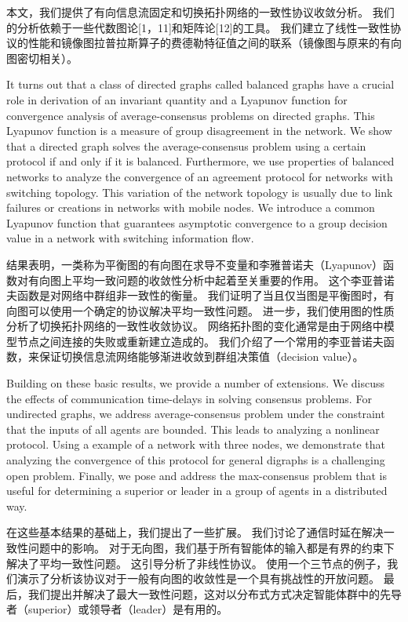 \documentclass{article}
\begin{document}
本文，我们提供了有向信息流固定和切换拓扑网络的一致性协议收敛分析。
我们的分析依赖于一些代数图论[1，11]和矩阵论[12]的工具。
我们建立了线性一致性协议的性能和镜像图拉普拉斯算子的费德勒特征值之间的联系（镜像图与原来的有向图密切相关）。

{\color[gray]{0.5}
It turns out that a class of directed graphs called balanced graphs have a crucial role in derivation of an invariant quantity and a Lyapunov function for convergence analysis of average-consensus problems on directed graphs. 
This Lyapunov function is a measure of group disagreement in the network. 
We show that a directed graph solves the average-consensus problem using a certain protocol if and only if it is balanced. 
Furthermore, we use properties of balanced networks to analyze the convergence of an agreement protocol for networks with switching topology. 
This variation of the network topology is usually due to link failures or creations in networks with mobile nodes. 
We introduce a common Lyapunov function that guarantees asymptotic convergence to a group decision value in a network with switching information ﬂow.
}

结果表明，一类称为平衡图的有向图在求导不变量和李雅普诺夫（Lyapunov）函数对有向图上平均一致问题的收敛性分析中起着至关重要的作用。
这个李亚普诺夫函数是对网络中群组非一致性的衡量。
我们证明了当且仅当图是平衡图时，有向图可以使用一个确定的协议解决平均一致性问题。
进一步，我们使用图的性质分析了切换拓扑网络的一致性收敛协议。
网络拓扑图的变化通常是由于网络中模型节点之间连接的失败或重新建立造成的。
我们介绍了一个常用的李亚普诺夫函数，来保证切换信息流网络能够渐进收敛到群组决策值（decision value）。

{\color[gray]{0.5}
Building on these basic results, we provide a number of extensions. 
We discuss the eﬀects of communication time-delays in solving consensus problems. 
For undirected graphs, we address average-consensus problem under the constraint that the inputs of all agents are bounded. 
This leads to analyzing a nonlinear protocol. 
Using a example of a network with three nodes, we demonstrate that analyzing the convergence of this protocol for general digraphs is a challenging open problem. 
Finally, we pose and address the max-consensus problem that is useful for determining a superior or leader in a group of agents in a distributed way.
}

在这些基本结果的基础上，我们提出了一些扩展。
我们讨论了通信时延在解决一致性问题中的影响。
对于无向图，我们基于所有智能体的输入都是有界的约束下解决了平均一致性问题。
这引导分析了非线性协议。
使用一个三节点的例子，我们演示了分析该协议对于一般有向图的收敛性是一个具有挑战性的开放问题。
最后，我们提出并解决了最大一致性问题，这对以分布式方式决定智能体群中的先导者（superior）或领导者（leader）是有用的。
\end{document}
